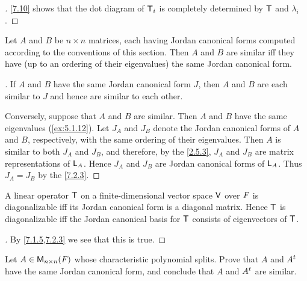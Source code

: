 \begin{proof}[]
  \cref{7.10} shows that the dot diagram of \(\mathsf{T}_i\) is completely determined by \(\mathsf{T}\) and \(\lambda_i\).
\end{proof}

\begin{thm}\label{7.11}
  Let \(A\) and \(B\) be \(n \times n\) matrices, each having Jordan canonical forms computed according to the conventions of this section.
  Then \(A\) and \(B\) are similar iff they have (up to an ordering of their eigenvalues) the same Jordan canonical form.
\end{thm}

\begin{proof}[]
  If \(A\) and \(B\) have the same Jordan canonical form \(J\), then \(A\) and \(B\) are each similar to \(J\) and hence are similar to each other.

  Conversely, suppose that \(A\) and \(B\) are similar.
  Then \(A\) and \(B\) have the same eigenvalues (\cref{ex:5.1.12}).
  Let \(J_A\) and \(J_B\) denote the Jordan canonical forms of \(A\) and \(B\), respectively, with the same ordering of their eigenvalues.
  Then \(A\) is similar to both \(J_A\) and \(J_B\), and therefore, by the \cref{2.5.3}, \(J_A\) and \(J_B\) are matrix representations of \(\mathsf{L}_A\).
  Hence \(J_A\) and \(J_B\) are Jordan canonical forms of \(\mathsf{L}_A\). Thus \(J_A = J_B\) by the \cref{7.2.3}.
\end{proof}

\begin{cor}\label{7.2.4}
  A linear operator \(\mathsf{T}\) on a finite-dimensional vector space \(\mathsf{V}\) over \(\mathit{F}\) is diagonalizable iff its Jordan canonical form is a diagonal matrix.
  Hence \(\mathsf{T}\) is diagonalizable iff the Jordan canonical basis for \(\mathsf{T}\) consists of eigenvectors of \(\mathsf{T}\).
\end{cor}

\begin{proof}[]
  By \cref{7.1.5,7.2.3} we see that this is true.
\end{proof}

\exercisesection

\setcounter{ex}{5}
\begin{ex}\label{ex:7.2.6}
  Let \(A \in \ms[n][n][\F]\) whose characteristic polynomial splits.
  Prove that \(A\) and \({A}^{t}\) have the same Jordan canonical form, and conclude that \(A\) and \({A}^{t}\) are similar.
\end{ex}

